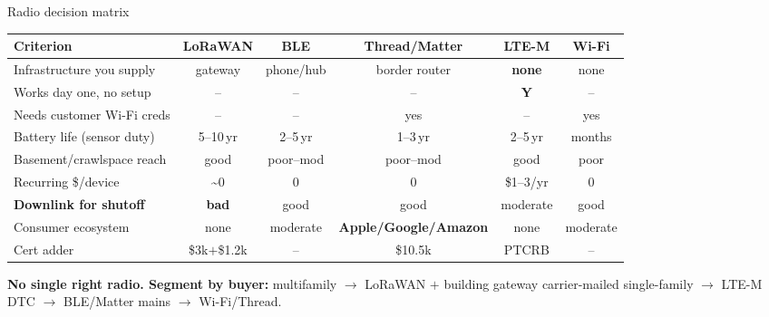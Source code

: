 \documentclass[aspectratio=169,t,10pt,xcolor={table,svgnames}]{beamer}
\newcommand{\yes}{\textbf{Y}}
\newcommand{\no}{--}
\newcommand{\hd}[1]{\textbf{\footnotesize #1}}
\begin{document}
\begin{frame}{Radio decision matrix}
  \scriptsize
  \begin{tabular}{@{}p{}ccccc@{}}
    \toprule
    \hd{Criterion} & \hd{LoRaWAN} & \hd{BLE} & \hd{Thread/Matter} & \hd{LTE-M} & \hd{Wi-Fi} \\
    \midrule
    Infrastructure you supply   & gateway        & phone/hub & border router & \cellcolor{fill1}\textbf{none} & none \\
    Works day one, no setup     & \no            & \no       & \no           & \cellcolor{fill1}\yes & \no \\
    Needs customer Wi-Fi creds  & \no            & \no       & yes           & \cellcolor{fill1}\no  & yes \\
    Battery life (sensor duty)  & \cellcolor{fill1}5--10\,yr & 2--5\,yr & 1--3\,yr & 2--5\,yr & months \\
    Basement/crawlspace reach   & \cellcolor{fill1}good      & poor--mod & poor--mod & good & poor \\
    Recurring \$/device         & \textasciitilde0 & 0 & 0 & \$1--3/yr & 0 \\
    \textbf{Downlink for shutoff} & \cellcolor{fill3}\textbf{bad} & good & good & moderate & good \\
    Consumer ecosystem          & none           & moderate  & \cellcolor{fill1}\textbf{Apple/Google/Amazon} & none & moderate \\
    Cert adder                  & \$3k$+$\$1.2k  & --        & \$10.5k       & PTCRB & -- \\
    \bottomrule
  \end{tabular}
  \vspace{0.6em}
  {\footnotesize \textbf{No single right radio. Segment by buyer:} multifamily $\rightarrow$ LoRaWAN
   $+$ building gateway \textperiodcentered{} carrier-mailed single-family $\rightarrow$ LTE-M
   \textperiodcentered{} DTC $\rightarrow$ BLE/Matter \textperiodcentered{} mains $\rightarrow$
   Wi-Fi/Thread.\par}
\end{frame}
\end{document}
